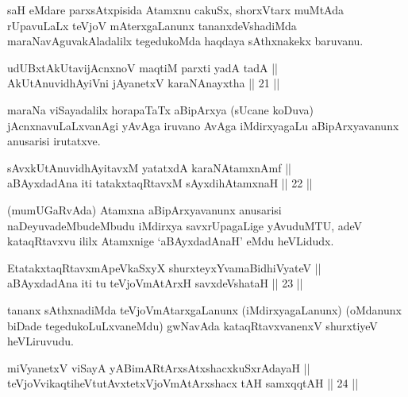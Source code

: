 \begin{artha}
saH eMdare parxsAtxpisida Atamxnu cakuSx, shorxVtarx muMtAda
rUpavuLaLx teVjoV mAterxgaLanunx tananxdeVshadiMda
maraNavAguvakAladalilx tegedukoMda haqdaya sAthxnakekx baruvanu.
\end{artha}

\begin{shl}
udUBxtAkUtavijAcnxnoV maqtiM parxti yadA tadA || \\
AkUtAnuvidhAyiVni jAyanetxV karaNAnayxtha \hfill || 21 ||
  
\end{shl}

\begin{artha}
maraNa viSayadalilx horapaTaTx aBipArxya (sUcane koDuva)
jAcnxnavuLaLxvanAgi yAvAga iruvano AvAga iMdirxyagaLu
aBipArxyavanunx anusarisi irutatxve.
\end{artha}


\begin{shl}
sAvxkUtAnuvidhAyitavxM yatatxdA karaNAtamxnAmf || \\
aBAyxdadAna iti tatakxtaqRtavxM sAyxdihA\s \s tamxnaH \hfill || 22 ||
  
\end{shl}

\begin{artha}
(mumUGaRvAda) Atamxna aBipArxyavanunx anusarisi naDeyuvadeMbudeMbudu
iMdirxya savxrUpagaLige yAvuduMTU, adeV kataqRtavxvu ililx Atamxnige
`aBAyxdadAnaH' eMdu heVLidudx.
\end{artha}

\begin{shl}
EtatakxtaqRtavxmApeVkaSxyX shurxteyxYvamaBidhiVyateV || \\
aBAyxdadAna iti tu teVjoVmAtArxH savxdeVshataH \hfill || 23 ||
  
\end{shl}

\begin{artha}
tananx sAthxnadiMda teVjoVmAtarxgaLanunx (iMdirxyagaLanunx) (oMdanunx
biDade tegedukoLuLxvaneMdu) gwNavAda kataqRtavxvanenxV shurxtiyeV
heVLiruvudu.
\end{artha}


\begin{shl}
miVyanetxV viSayA yABimARtArxsAtxshacxkuSxrAdayaH || \\
teVjoVvikaqtiheVtutAvxtetxVjoVmAtArxshacx tAH samxqqtAH \hfill || 24 ||
  
\end{shl}

